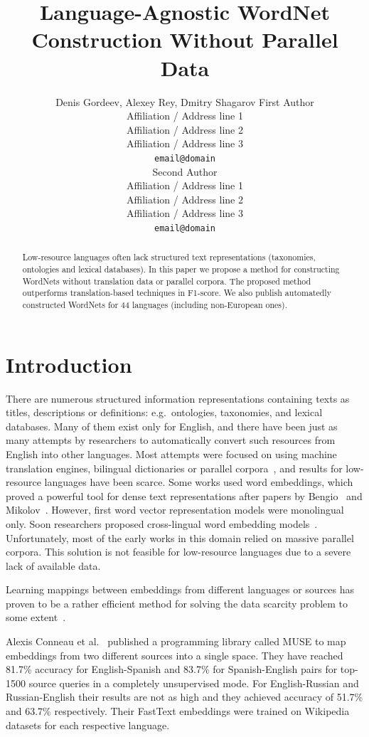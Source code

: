 \documentclass[11pt,a4paper]{article}
\title{Language-Agnostic WordNet Construction Without Parallel Data}
\author{Denis Gordeev, Alexey Rey, Dmitry Shagarov
	First Author \\
  Affiliation / Address line 1 \\
  Affiliation / Address line 2 \\
  Affiliation / Address line 3 \\
  \texttt{email@domain} \\\And
  Second Author \\
  Affiliation / Address line 1 \\
  Affiliation / Address line 2 \\
  Affiliation / Address line 3 \\
  \texttt{email@domain} \\}
\date{}
\begin{document}
\maketitle
\begin{abstract}
Low-resource languages often lack structured text representations (taxonomies, ontologies and lexical databases). In this paper we propose a method for constructing WordNets without translation data or parallel corpora. The proposed method outperforms translation-based techniques in F1-score. We also publish automatedly constructed WordNets for 44 languages (including non-European ones).
\end{abstract}

\section{Introduction}

There are numerous structured information representations containing texts as titles, descriptions or definitions: e.g.\ ontologies, taxonomies, and lexical databases. Many of them exist only for English, and there have been just as many attempts by researchers to automatically convert such resources from English into other languages. Most attempts were focused on using machine translation engines, bilingual dictionaries or parallel corpora~\cite{Khodak2017,NEALE18.1030}, and results for low-resource languages have been scarce. Some works used word embeddings, which proved a powerful tool for dense text representations after papers by Bengio~\cite{bengio} and Mikolov~\cite{mikolov-representations-2013}. However, first word vector representation models were monolingual only. Soon researchers proposed cross-lingual word embedding models~\cite{mikolov-parallel,lazaridou-parallel}. Unfortunately, most of the early works in this domain relied on massive parallel corpora. This solution is not feasible for low-resource languages due to a severe lack of available data.

Learning mappings between embeddings from different languages or sources has proven to be a rather efficient method for solving the data scarcity problem to some extent~\cite{ruder-survey}.

Alexis Conneau et al.~\cite{muse} published a programming library called MUSE to map embeddings from two different sources into a single space. They have reached 81.7\% accuracy for English-Spanish and 83.7\% for Spanish-English pairs for top-1500 source queries in a completely unsupervised mode. For English-Russian and Russian-English their results are not as high and they achieved accuracy of 51.7\% and 63.7\% respectively. Their FastText embeddings were trained on Wikipedia datasets for each respective language. 
\end{document}
